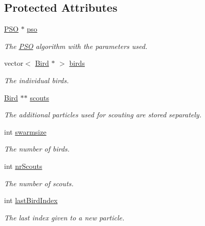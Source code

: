 \subsection*{Protected Attributes}
\begin{CompactItemize}
\item 
\hyperlink{classPSO}{PSO} $\ast$ \hyperlink{classSwarm_0e0ea6b1259774c2b2390536e936bcfc}{pso}
\begin{CompactList}\small\item\em The \hyperlink{classPSO}{PSO} algorithm with the parameters used. \item\end{CompactList}\item 
vector$<$ \hyperlink{classBird}{Bird} $\ast$ $>$ \hyperlink{classSwarm_74191c7a473df093f5537f8d6d5ca1a6}{birds}
\begin{CompactList}\small\item\em The individual birds. \item\end{CompactList}\item 
\hyperlink{classBird}{Bird} $\ast$$\ast$ \hyperlink{classSwarm_9520522dd61ae47abc1781be180c01e3}{scouts}
\begin{CompactList}\small\item\em The additional particles used for scouting are stored separately. \item\end{CompactList}\item 
int \hyperlink{classSwarm_0ed97963cfeb4f2b8eee5c4fb6f6dcde}{swarmsize}
\begin{CompactList}\small\item\em The number of birds. \item\end{CompactList}\item 
int \hyperlink{classSwarm_6ec8b4463d83af484788490c203ae166}{nrScouts}
\begin{CompactList}\small\item\em The number of scouts. \item\end{CompactList}\item 
int \hyperlink{classSwarm_9e9e482ef70387a81721eb5e2b998725}{lastBirdIndex}
\begin{CompactList}\small\item\em The last index given to a new particle. \item\end{CompactList}\item 
$$
\end{CompactItemize}
